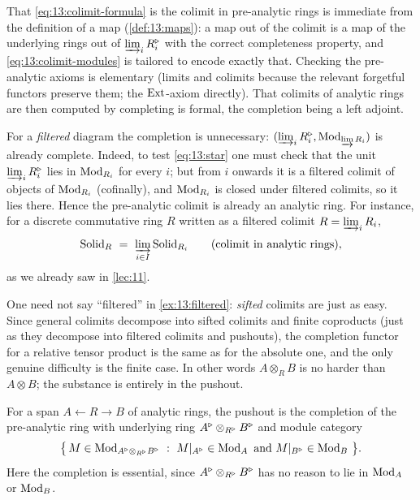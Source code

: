 That \eqref{eq:13:colimit-formula} is the colimit in pre-analytic rings is
immediate from the definition of a map (\cref{def:13:maps}): a map out of the
colimit is a map of the underlying rings out of $\varinjlim_iR^{\triangleright}_i$ with the
correct completeness property, and \eqref{eq:13:colimit-modules} is tailored to
encode exactly that. Checking the pre-analytic axioms is elementary (limits and
colimits because the relevant forgetful functors preserve them; the $\operatorname{Ext}$-axiom
directly). That colimits of analytic rings are then computed by completing is
formal, the completion being a left adjoint.

\begin{example}
\label{ex:13:filtered}
For a \emph{filtered} diagram the completion is unnecessary:
$(\varinjlim_iR^{\triangleright}_i,\operatorname{Mod}_{\varinjlim R_i})$ is already complete. Indeed, to
test \eqref{eq:13:star} one must check that the unit $\varinjlim_iR^{\triangleright}_i$ lies in
$\operatorname{Mod}_{R_i}$ for every $i$; but from $i$ onwards it is a filtered colimit of
objects of $\operatorname{Mod}_{R_i}$ (cofinally), and $\operatorname{Mod}_{R_i}$ is closed under filtered
colimits, so it lies there. Hence the pre-analytic colimit is already an analytic
ring. For instance, for a discrete commutative ring $R$ written as a filtered
colimit $R=\varinjlim_i R_i$,
\begin{equation*}
\mathrm{Solid}_R\ =\ \varinjlim_{i\in I}\mathrm{Solid}_{R_i}\qquad(\text{colimit in analytic rings}),
\end{equation*}
as we already saw in \cref{lec:11}.
\end{example}

\begin{remark}
\label{rmk:13:sifted}
One need not say ``filtered'' in \cref{ex:13:filtered}: \emph{sifted} colimits are
just as easy. Since general colimits decompose into sifted colimits and finite
coproducts (just as they decompose into filtered colimits and pushouts), the
completion functor for a relative tensor product is the same as for the absolute
one, and the only genuine difficulty is the finite case. In other words
$A\otimes_R B$ is no harder than $A\otimes B$; the substance is entirely in the
pushout.
\end{remark}

\begin{example}
\label{ex:13:pushouts}
For a span $A\leftarrow R\rightarrow B$ of analytic rings, the pushout is the
completion of the pre-analytic ring with underlying ring $A^{\triangleright}\otimes_{R^{\triangleright}}B^{\triangleright}$
and module category
\begin{equation}
\label{eq:13:pushout-modules}
\big\{\,M\in\Mod_{\ur A\otimes_{\ur R}\ur B}\ :\ M|_{\ur A}\in\Mod_A\ \text{and}\ M|_{\ur B}\in\Mod_B\,\big\}.
\end{equation}
Here the completion is essential, since $A^{\triangleright}\otimes_{R^{\triangleright}}B^{\triangleright}$ has no reason
to lie in $\operatorname{Mod}_A$ or $\operatorname{Mod}_B$.
\end{example}

